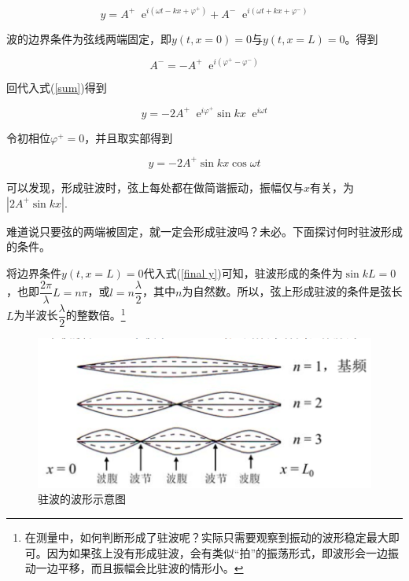 \documentclass[a4paper,11pt]{article}
\newcommand*{\e}{\mathop{}\!\mathrm{e}}
\begin{document}
            \begin{equation}
                y=A^+ \e^{i(\omega t-kx+\varphi^+)} + A^- \e^{i(\omega t+kx+\varphi^-)}
                \label{sum}
            \end{equation}

            波的边界条件为弦线两端固定，即$y(t,x=0)=0$与$y(t,x=L)=0$。得到
            
            \begin{equation}
                A^- = -A^+ \e^{i(\varphi^+-\varphi^-)}
            \end{equation}

            回代入式(\ref{sum})得到

            \begin{equation}
                y = -2A^+\e^{i\varphi^+}\sin kx \e^{i\omega t}
                \label{final y}
            \end{equation}

            令初相位$\varphi^+ = 0$，并且取实部得到
            
            \begin{equation}
                y = -2 A^+ \sin kx\cos \omega t 
            \end{equation}

            可以发现，形成驻波时，弦上每处都在做简谐振动，振幅仅与$x$有关，为$|2A^+\sin kx|$.
            
            难道说只要弦的两端被固定，就一定会形成驻波吗？未必。下面探讨何时驻波形成的条件。

            将边界条件$y(t,x=L)=0$代入式(\ref{final y})可知，驻波形成的条件为$\sin kL = 0$，也即$\dfrac{2\pi}\lambda L = n\pi$，或$l=n\dfrac\lambda 2$，其中$n$为自然数。所以，弦上形成驻波的条件是弦长$L$为半波长$\dfrac\lambda 2$的整数倍。\footnote{在测量中，如何判断形成了驻波呢？实际只需要观察到振动的波形稳定最大即可。因为如果弦上没有形成驻波，会有类似“拍”的振荡形式，即波形会一边振动一边平移，而且振幅会比驻波的情形小。}

            \begin{figure}[ht]
                \centering
                \includegraphics[scale=0.7]{驻波.png}
                \caption{驻波的波形示意图}
                \label{驻波}
            \end{figure}
\end{document}
